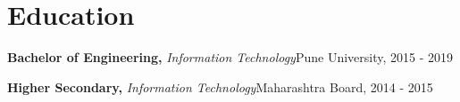 \documentclass{article}
\newenvironment{education}[4]{%
  \noindent
  \textbf{#1,} \textit{#2}\hfill{#3,} {#4}%
  \par
}{\bigskip}
\begin{document}

\section*{Education}
\begin{education}{Bachelor of Engineering}{Information Technology}{Pune University}{2015 - 2019}
\end{education}
\begin{education}{Higher Secondary}{Information Technology}{Maharashtra Board}{2014 - 2015}
\end{education}
\end{document}

